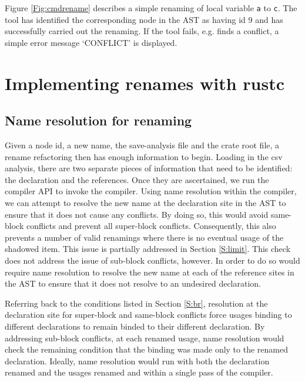 Figure \ref{Fig:cmdrename} describes a simple renaming of local variable {\verb|a|} to {\verb|c|}. The tool has identified the corresponding node in the AST as having id 9 and has successfully carried out the renaming. If the tool fails, e.g. finds a conflict, a simple error message `CONFLICT' is displayed.


\section{Implementing renames with rustc}\label{S:building}
\subsection{Name resolution for renaming}
Given a node id, a new name, the save-analysis file and the crate root file, a rename refactoring then has enough information to begin. Loading in the csv analysis, there are two separate pieces of information that need to be identified: the declaration and the references. Once they are ascertained, we run the compiler API to invoke the compiler. Using name resolution within the compiler, we can attempt to resolve the new name at the declaration site in the AST to ensure that it does not cause any conflicts. By doing so, this would avoid same-block conflicts and prevent all super-block conflicts. Consequently, this also prevents a number of valid renamings where there is no eventual usage of the shadowed item. This issue is partially addressed in Section \ref{S:limit}. This check does not address the issue of sub-block conflicts, however. In order to do so would require name resolution to resolve the new name at each of the reference sites in the AST to ensure that it does not resolve to an undesired declaration. 

Referring back to the conditions listed in Section \ref{S:br}, resolution at the declaration site for super-block and same-block conflicts force usages binding to different declarations to remain binded to their different declaration. By addressing sub-block conflicts, at each renamed usage, name resolution would check the remaining condition that the binding was made only to the renamed declaration. Ideally, name resolution would run with both the declaration renamed and the usages renamed and within a single pass of the compiler.

